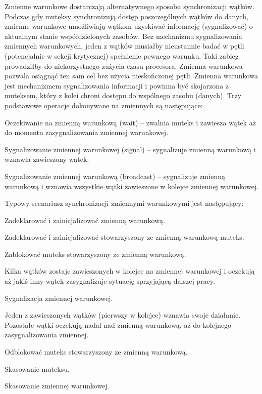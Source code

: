 Zmienne warunkowe dostarczają alternatywnego sposobu synchronizacji wątków. Podczas gdy muteksy synchronizują dostęp poszczególnych wątków do danych, zmienne warunkowe umożliwiają wątkom uzyskiwać informację (sygnalizować) o aktualnym stanie współdzielonych zasobów. Bez mechanizmu sygnalizowania zmiennych warunkowych, jeden z wątków musiałby nieustannie badać w pętli (potencjalnie w sekcji krytycznej) spełnienie pewnego warunku. Taki zabieg prowadziłby do niekorzystnego zużycia czasu procesora. Zmienna warunkowa pozwala osiągnąć ten sam cel bez użycia nieskończonej pętli.
Zmienna warunkowa jest mechanizmem sygnalizowania informacji i powinna być skojarzona z muteksem, który z kolei chroni dostępu do wspólnego zasobu (danych). Trzy podstawowe operacje dokonywane na zmiennych są następujące:

\begin{myitemize}
\item Oczekiwanie na zmienną warunkową (wait) – zwalnia muteks i zawiesza wątek aż do momentu zasygnalizowania zmiennej warunkowej.
\item Sygnalizowanie zmiennej warunkowej (signal) – sygnalizuje zmienną warunkową i wznawia zawieszony wątek.
\item Sygnalizowanie zmiennej warunkową (broadcast) – sygnalizuje zmienną warunkową i wznawia wszystkie wątki zawieszone w kolejce zmiennej warunkowej.
\end{myitemize}

Typowy scenariusz synchronizacji zmiennymi warunkowymi jest następujący:
\begin{myitemize}
\item Zadeklarować i zainicjalizować zmienną warunkową.
\item Zadeklarować i zainicjalizować stowarzyszony ze zmienną warunkową muteks.
\item Zablokować muteks stowarzyszony ze zmienną warunkową.
\item Kilka wątków zostaje zawieszonych w kolejce na zmiennej warunkowej i oczekują aż jakiś inny wątek zasygnalizuje sytuację sprzyjającą dalszej pracy.
\item Sygnalizacja zmiennej warunkowej.
\item Jeden z zawieszonych wątków (pierwszy w kolejce) wznawia swoje działanie. Pozostałe wątki oczekują nadal nad zmienną warunkową, aż do kolejnego zasygnalizowania zmiennej.
\item Odblokować muteks stowarzyszony ze zmienną warunkową.
\item Skasowanie muteksu.
\item Skasowanie zmiennej warunkowej.
\end{myitemize}


